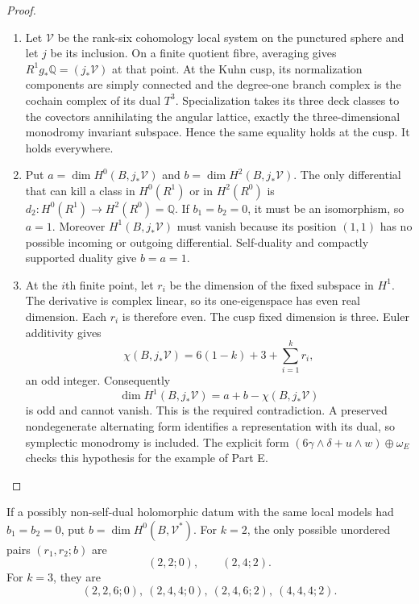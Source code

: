 \begin{proof}
\begin{enumerate}[label=\arabic*.]
\item Let $\mathcal V$ be the rank-six cohomology local system on
the punctured sphere and let $j$ be its inclusion.  On a finite
quotient fibre, averaging gives $R^1g_*\mathbb Q=(j_*\mathcal V)$
at that point.  At the Kuhn cusp, its normalization components
are simply connected and the degree-one branch complex is
the cochain complex of its dual $T^3$.  Specialization takes
its three deck classes to the covectors annihilating the
angular lattice, exactly the three-dimensional monodromy
invariant subspace.  Hence the same equality holds at the cusp.
It holds everywhere.

\item Put $a=\dim H^0(B,j_*\mathcal V)$ and
$b=\dim H^2(B,j_*\mathcal V)$.  The only differential that
can kill a class in $H^0(R^1)$ or in $H^2(R^0)$ is
$d_2:H^0(R^1)\to H^2(R^0)=\mathbb Q$.  If $b_1=b_2=0$,
it must be an isomorphism, so $a=1$.  Moreover
$H^1(B,j_*\mathcal V)$ must vanish because its position
$(1,1)$ has no possible incoming or outgoing differential.
Self-duality and compactly supported duality give $b=a=1$.

\item At the $i$th finite point, let $r_i$ be the dimension of the
fixed subspace in $H^1$.  The derivative is complex linear,
so its one-eigenspace has even real dimension.  Each $r_i$
is therefore even.  The cusp fixed dimension is three.
Euler additivity gives
\[
 \chi(B,j_*\mathcal V)=6(1-k)+3+\sum_{i=1}^k r_i,
\]
an odd integer.  Consequently
\[
 \dim H^1(B,j_*\mathcal V)=a+b-\chi(B,j_*\mathcal V)
\]
is odd and cannot vanish.  This is the required contradiction.
A preserved nondegenerate alternating form identifies a
representation with its dual, so symplectic monodromy is
included.  The explicit form
$(6\gamma\wedge\delta+u\wedge w)\oplus\omega_E$
checks this hypothesis for the example of Part E.

\end{enumerate}
\end{proof}




\begin{proposition}\label{maps:src:F.3.2}


If a possibly non-self-dual holomorphic datum with the same
local models had $b_1=b_2=0$, put
$b=\dim H^0(B,\mathcal V^*)$.  For $k=2$, the only possible
unordered pairs $(r_1,r_2;b)$ are
\[
 (2,2;0),\qquad(2,4;2).
\]
For $k=3$, they are
\[
 (2,2,6;0),\ (2,4,4;0),\ (2,4,6;2),\ (4,4,4;2).
 \tag{F.4}\label{maps:eq:F.4}
\]

\end{proposition}


